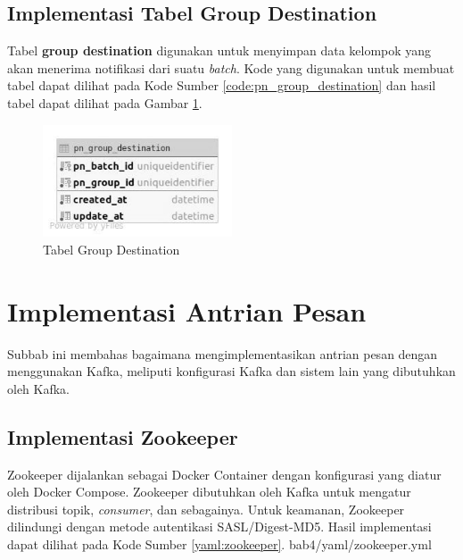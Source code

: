 \subsection{Implementasi Tabel Group Destination}
\par Tabel \textbf{group destination} digunakan untuk menyimpan data kelompok yang akan menerima notifikasi dari suatu \textit{batch}. Kode yang digunakan untuk membuat tabel dapat dilihat pada Kode Sumber \ref{code:pn_group_destination} dan hasil tabel dapat dilihat pada Gambar \ref{tabel_pn_group_destination}.

\begin{figure}[H]
    \centering\includegraphics[width=0.5\textwidth]{bab4/figures/tabel_pn_group_destination.jpg}
    \caption{Tabel Group Destination}
    \label{tabel_pn_group_destination}
\end{figure}

\section{Implementasi Antrian Pesan}
\par Subbab ini membahas bagaimana mengimplementasikan antrian pesan dengan menggunakan Kafka, meliputi konfigurasi Kafka dan sistem lain yang dibutuhkan oleh Kafka.

\subsection{Implementasi Zookeeper}
\par Zookeeper dijalankan sebagai Docker Container dengan konfigurasi yang diatur oleh Docker Compose. Zookeeper dibutuhkan oleh Kafka untuk mengatur distribusi topik, \textit{consumer}, dan sebagainya. Untuk keamanan, Zookeeper dilindungi dengan metode autentikasi SASL/Digest-MD5. Hasil implementasi dapat dilihat pada Kode Sumber \ref{yaml:zookeeper}.
 {bab4/yaml/zookeeper.yml}

